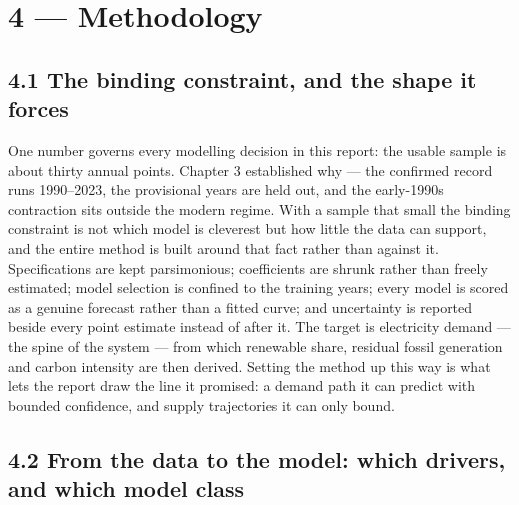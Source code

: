 \documentclass[10pt,twocolumn]{article}
\begin{document}
\section*{4 --- Methodology}

\subsection*{4.1 The binding constraint, and the shape it forces}

One number governs every modelling decision in this report: the usable sample is about thirty annual points. Chapter 3 established why --- the confirmed record runs 1990--2023, the provisional years are held out, and the early-1990s contraction sits outside the modern regime. With a sample that small the binding constraint is not which model is cleverest but how little the data can support, and the entire method is built around that fact rather than against it. Specifications are kept parsimonious; coefficients are shrunk rather than freely estimated; model selection is confined to the training years; every model is scored as a genuine forecast rather than a fitted curve; and uncertainty is reported beside every point estimate instead of after it. The target is electricity demand --- the spine of the system --- from which renewable share, residual fossil generation and carbon intensity are then derived. Setting the method up this way is what lets the report draw the line it promised: a demand path it can predict with bounded confidence, and supply trajectories it can only bound.

\subsection*{4.2 From the data to the model: which drivers, and which model class}
\end{document}
